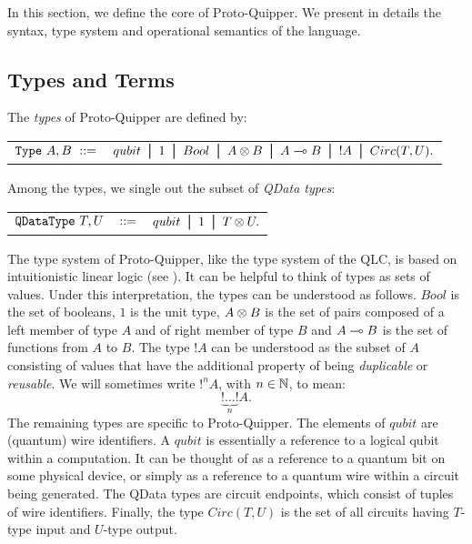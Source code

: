 \documentclass{article}
\begin{document}
In this section, we define the core of Proto-Quipper. We 
present in details the syntax, type system and 
operational semantics of the language.

\subsection{Types and Terms}
\label{ssec-types-and-terms}

\begin{definition} 
The \emph{types} of Proto-Quipper are defined by:
\begin{center}
\begin{tabular}{rl}
$\texttt{Type}~A,B~::=$ & $ qubit \bor 1 \bor Bool \bor A\tensor B \bor 
A\loli B \bor !A \bor Circ (T,U).$\\
\end{tabular}
\end{center}
Among the types, we single out the subset of \emph{QData types}:
\begin{center}
\begin{tabular}{rcl}
$\texttt{QDataType}~T,U$ & $::=$ & $qubit \bor 1 \bor T \tensor U.$
\end{tabular}
\end{center}
\end{definition}

The type system of Proto-Quipper, like the type system of the QLC, 
is based on intuitionistic linear logic (see \cite{Gir87}). 
It can be helpful to think of types as sets of values. Under this 
interpretation, the types can be understood as follows. $Bool$ is 
the set of booleans, $1$ is the unit type, $A\otimes B$ is the set of 
pairs composed of a left member of type $A$ and of right member 
of type $B$ and $A\multimap B$ is the set of functions from $A$ to 
$B$. The type $!A$ can be understood as the subset of $A$ 
consisting of values that have the additional property of being 
\emph{duplicable} or \emph{reusable}. We will sometimes write 
$!^nA$, with $n\in\mathbb{N}$, to mean: 
\[
\underbrace{!\ldots !}_{n} A.
\]
The remaining types are specific to Proto-Quipper. The elements 
of $qubit$ are (quantum) wire identifiers. A $qubit$ is essentially 
a reference to a  logical qubit within a computation. It can be 
thought of as a reference to a quantum bit on some physical device, 
or simply as a  reference to a quantum wire within a circuit being 
generated. The QData types are circuit endpoints, which consist of 
tuples of wire identifiers. Finally, the type $Circ(T,U)$ is the 
set of all circuits having $T$-type input and $U$-type output. 
\end{document}
